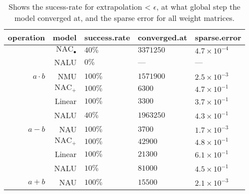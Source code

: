 \begin{table}[H]

\caption{\label{tab:}Shows the sucess-rate for extrapolation < $\epsilon$, at what global step the model converged at, and the sparse error for all weight matrices.}
\centering
\begin{tabular}{rrlll}
\toprule
operation & model & success.rate & converged.at & sparse.error\\
\midrule
 & $\mathrm{NAC}_{\bullet}$ & $40\%$ & $3371250$ & $4.7 \times 10^{-4}$\\

 & NALU & $0\%$ & --- & ---\\

\multirow{-3}{*}{\raggedleft\arraybackslash ${a \cdot b}$} & NMU & $100\%$ & $1571900$ & $2.5 \times 10^{-3}$\\
\cmidrule{1-5}
 & $\mathrm{NAC}_{+}$ & $100\%$ & $6300$ & $4.7 \times 10^{-1}$\\

 & Linear & $100\%$ & $3300$ & $3.7 \times 10^{-1}$\\

 & NALU & $40\%$ & $1963250$ & $4.3 \times 10^{-1}$\\

\multirow{-4}{*}{\raggedleft\arraybackslash $a - b$} & NAU & $100\%$ & $3700$ & $1.7 \times 10^{-3}$\\
\cmidrule{1-5}
 & $\mathrm{NAC}_{+}$ & $100\%$ & $42900$ & $4.8 \times 10^{-1}$\\

 & Linear & $100\%$ & $21300$ & $6.1 \times 10^{-1}$\\

 & NALU & $10\%$ & $81000$ & $4.5 \times 10^{-1}$\\

\multirow{-4}{*}{\raggedleft\arraybackslash $a + b$} & NAU & $100\%$ & $15500$ & $2.1 \times 10^{-3}$\\
\bottomrule
\end{tabular}
\end{table}
